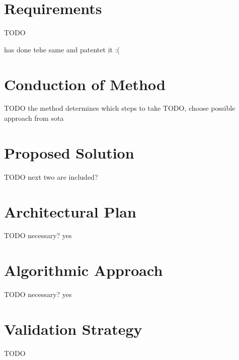 \section{Requirements}
TODO

\autocite[][]{xang2016trafficlist} has done tehe same and patentet it :(

\section{Conduction of Method}
TODO the method determines which steps to take
TODO, choose possible approach from sota

\section{Proposed Solution}
TODO next two are included?

\section{Architectural Plan}
TODO necessary? yes

\section{Algorithmic Approach}
TODO necessary? yes

\section{Validation Strategy}

TODO